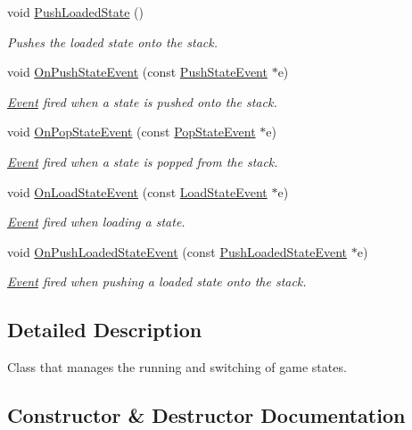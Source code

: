 \begin{DoxyCompactItemize}
void \hyperlink{classStateManager_ae296599b6c4332317d9ce844f5e3bad4}{Push\+Loaded\+State} ()
\begin{DoxyCompactList}\small\item\em Pushes the loaded state onto the stack. \end{DoxyCompactList}\item 
void \hyperlink{classStateManager_a6183ca80b9da1ff95457d070565bfb72}{On\+Push\+State\+Event} (const \hyperlink{classPushStateEvent}{Push\+State\+Event} $\ast$e)
\begin{DoxyCompactList}\small\item\em \hyperlink{classEvent}{Event} fired when a state is pushed onto the stack. \end{DoxyCompactList}\item 
void \hyperlink{classStateManager_ad50899842a3951f45bb6a0fd8d02742e}{On\+Pop\+State\+Event} (const \hyperlink{classPopStateEvent}{Pop\+State\+Event} $\ast$e)
\begin{DoxyCompactList}\small\item\em \hyperlink{classEvent}{Event} fired when a state is popped from the stack. \end{DoxyCompactList}\item 
void \hyperlink{classStateManager_a133f491b1a698d5122c26f03fe16e3a7}{On\+Load\+State\+Event} (const \hyperlink{classLoadStateEvent}{Load\+State\+Event} $\ast$e)
\begin{DoxyCompactList}\small\item\em \hyperlink{classEvent}{Event} fired when loading a state. \end{DoxyCompactList}\item 
void \hyperlink{classStateManager_a08fd8358ae6f2258dfad8fce0b89a10a}{On\+Push\+Loaded\+State\+Event} (const \hyperlink{classPushLoadedStateEvent}{Push\+Loaded\+State\+Event} $\ast$e)
\begin{DoxyCompactList}\small\item\em \hyperlink{classEvent}{Event} fired when pushing a loaded state onto the stack. \end{DoxyCompactList}\end{DoxyCompactItemize}


\subsection{Detailed Description}
Class that manages the running and switching of game states. 

\subsection{Constructor \& Destructor Documentation}
\mbox{\label{classStateManager_ace918db0f769af43e0067ac425ef640a}} 
